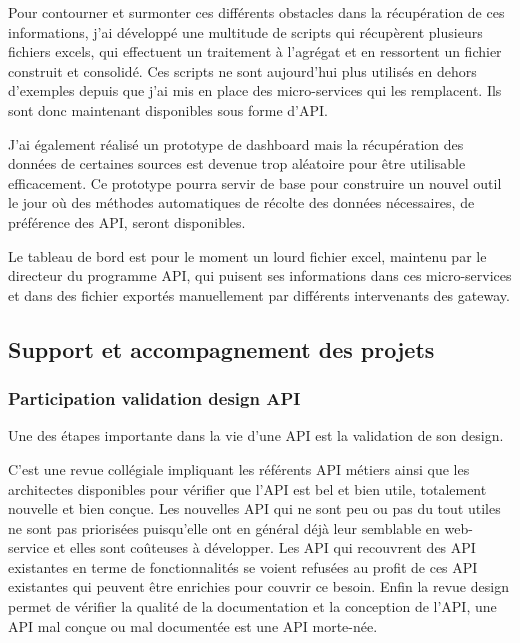         Pour contourner et surmonter ces différents obstacles dans la récupération de ces informations, j’ai développé une multitude de scripts qui récupèrent plusieurs fichiers excels, qui effectuent un traitement à l’agrégat et en ressortent un fichier construit et consolidé.
        Ces scripts ne sont aujourd’hui plus utilisés en dehors d’exemples depuis que j’ai mis en place des micro-services qui les remplacent.
        Ils sont donc maintenant disponibles sous forme d’API.

        J’ai également réalisé un prototype de dashboard mais la récupération des données de certaines sources est devenue trop aléatoire pour être utilisable efficacement.
        Ce prototype pourra servir de base pour construire un nouvel outil le jour où des méthodes automatiques de récolte des données nécessaires, de préférence des API, seront disponibles.

        Le tableau de bord est pour le moment un lourd fichier excel, maintenu par le directeur du programme API, qui puisent ses informations dans ces micro-services et dans des fichier exportés manuellement par différents intervenants des gateway.

    \subsection{Support et accompagnement des projets}

        \subsubsection{Participation validation design API}

        Une des étapes importante dans la vie d’une API est la validation de son design.

        C’est une revue collégiale impliquant les référents API métiers ainsi que les architectes disponibles pour vérifier que l’API est bel et bien utile, totalement nouvelle et bien conçue.
        Les nouvelles API qui ne sont peu ou pas du tout utiles ne sont pas priorisées puisqu’elle ont en général déjà leur semblable en web-service et elles sont coûteuses à développer.
        Les API qui recouvrent  des API existantes en terme de fonctionnalités se voient refusées au profit de ces API existantes qui peuvent être enrichies pour couvrir ce besoin.
        Enfin la revue design permet de vérifier la qualité de la documentation et la conception de l’API, une API mal conçue ou mal documentée est une API morte-née.

